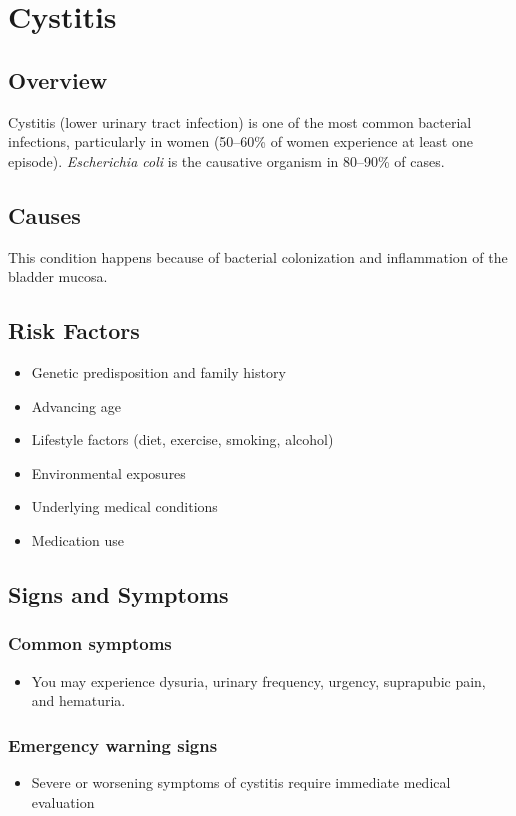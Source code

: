 \chapter{Cystitis}
\label{sec:Cystitis}

\section{Overview}
Cystitis (lower urinary tract infection) is one of the most common bacterial infections, particularly in women (50--60\% of women experience at least one episode). \textit{Escherichia coli} is the causative organism in 80--90\% of cases.
\section{Causes}
This condition happens because of bacterial colonization and inflammation of the bladder mucosa.     
\section{Risk Factors}

\begin{itemize}[noitemsep]
  \item Genetic predisposition and family history
  \item Advancing age
  \item Lifestyle factors (diet, exercise, smoking, alcohol)
  \item Environmental exposures
  \item Underlying medical conditions
  \item Medication use
\end{itemize}
\section{Signs and Symptoms}

\subsection{Common symptoms}
\begin{itemize}[noitemsep]
  \item You may experience dysuria, urinary frequency, urgency, suprapubic pain, and hematuria. 
  \end{itemize}

\subsection{Emergency warning signs}
\begin{itemize}[noitemsep]
  \item Severe or worsening symptoms of cystitis require immediate medical evaluation
\end{itemize}
